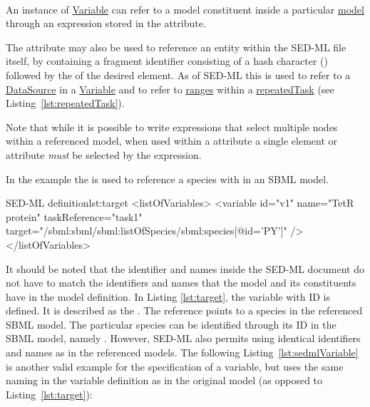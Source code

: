 \paragraph*{}
\label{sec:target}
An instance of \hyperref[class:variable]{Variable} can refer to a model constituent inside a particular \hyperref[class:model]{model} through an  expression stored in the  attribute. 

The  attribute may also be used to reference an entity within the SED-ML file itself, by containing a fragment identifier consisting of a hash character (\code{\#}) followed by the \hyperref[type:sid]{} of the desired element. As of SED-ML \currentLV this is used to refer to a \hyperref[class:dataSource]{DataSource} in a \hyperref[class:variable]{Variable} and to refer to \hyperref[sec:listOfRanges]{ranges} within a \hyperref[class:repeatedTask]{repeatedTask} (see Listing~\ref{lst:repeatedTask}).

Note that while it is possible to write  expressions that select multiple nodes within a referenced model, when used within a  attribute a single element or attribute \emph{must} be selected by the expression.

In the example the  is used to reference a species with  in an SBML model.
\begin{myXmlLst}{SED-ML  definition}{lst:target}
<listOfVariables>
	<variable id="v1" name="TetR protein" taskReference="task1" 
		target="/sbml:sbml/sbml:listOfSpecies/sbml:species[@id='PY']" />
</listOfVariables>
\end{myXmlLst}

It should be noted that the identifier and names inside the SED-ML document do not have to match the identifiers and names that the model and its constituents have in the model definition. In Listing \ref{lst:target}, the variable with ID  is defined. It is described as the . The reference points to a species in the referenced SBML model. The particular species can be identified through its ID in the SBML model, namely . However, SED-ML also permits using identical identifiers and names as in the referenced models. The following Listing~\vref{lst:sedmlVariable} is another valid example for the specification of a variable, but uses the same naming in the variable definition as in the original model (as opposed to Listing~\ref{lst:target}):

